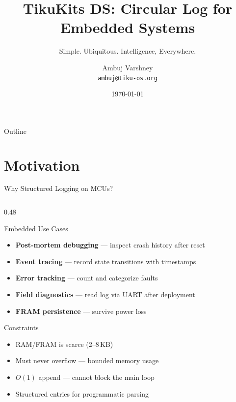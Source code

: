 \documentclass[aspectratio=169, 10pt]{beamer}
\title[TikuKits DS]{TikuKits DS: Circular Log for Embedded Systems}
\subtitle{Simple. Ubiquitous. Intelligence, Everywhere.}
\author[Ambuj Varshney]{Ambuj Varshney \\ \texttt{ambuj@tiku-os.org}}
\date{\today}
\begin{document}
\begin{frame}
\titlepage
\end{frame}

\begin{frame}{Outline}
\tableofcontents
\end{frame}

\section{Motivation}

\begin{frame}{Why Structured Logging on MCUs?}
\begin{columns}[T]
\begin{column}{0.48\textwidth}
\begin{block}{Embedded Use Cases}
\begin{itemize}
  \item \textbf{Post-mortem debugging} --- inspect crash history after reset
  \item \textbf{Event tracing} --- record state transitions with timestamps
  \item \textbf{Error tracking} --- count and categorize faults
  \item \textbf{Field diagnostics} --- read log via UART after deployment
  \item \textbf{FRAM persistence} --- survive power loss
\end{itemize}
\end{block}

\begin{block}{Constraints}
\begin{itemize}
  \item RAM/FRAM is scarce (2--8\,KB)
  \item Must never overflow --- bounded memory usage
  \item $O(1)$ append --- cannot block the main loop
  \item Structured entries for programmatic parsing
\end{itemize}
\end{block}
\end{column}


\end{columns}
\end{frame}
\end{document}
